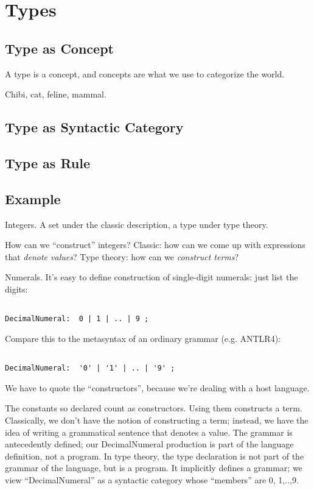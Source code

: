 \chapter{Types}

\section{Type as Concept}
A type is a concept, and concepts are what we use to categorize the
world.

Chibi, cat, feline, mammal.

\section{Type as Syntactic Category}

\section{Type as Rule}

\section{Example}

Integers.  A set under the classic description, a type under type theory.

How can we ``construct'' integers?  Classic: how can we come up with
expressions that \textit{denote values}?  Type theory: how can we
\textit{construct terms}?

Numerals.  It's easy to define construction of single-digit numerals:
just list the digits:

\begin{verbatim}

DecimalNumeral:  0 | 1 | .. | 9 ;

\end{verbatim}

Compare this to the metasyntax of an ordinary grammar (e.g. ANTLR4):

\begin{verbatim}

DecimalNumeral:  '0' | '1' | .. | '9' ;

\end{verbatim}

We have to quote the ``constructors'', because we're dealing with a
host language.

The constants so declared count as constructors.  Using them
constructs a term.  Classically, we don't have the notion of
constructing a term; instead, we have the idea of writing a
grammatical sentence that denotes a value.  The grammar is
antecedently defined; our DecimalNumeral production is part of the
language definition, not a program.  In type theory, the type
declaration is not part of the grammar of the language, but is a
program.  It implicitly defines a grammar; we view ``DecimalNumeral''
as a syntactic category whose ``members'' are 0, 1,..,9.

